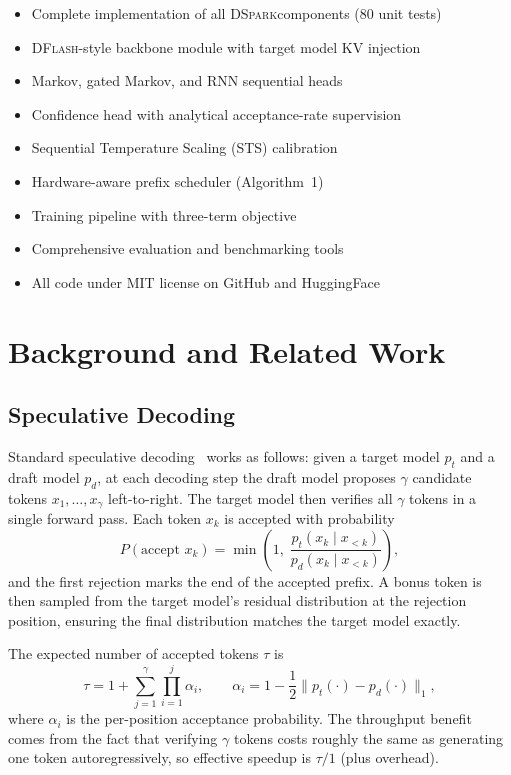 \documentclass[11pt,a4paper]{article}
\newcommand{\DSpark}{\textsc{DSpark}}
\newcommand{\DFlash}{\textsc{DFlash}}
\begin{document}
\begin{itemize}
  \item Complete implementation of all \DSpark components (80 unit tests)
  \item \DFlash-style backbone module with target model KV injection
  \item Markov, gated Markov, and RNN sequential heads
  \item Confidence head with analytical acceptance-rate supervision
  \item Sequential Temperature Scaling (STS) calibration
  \item Hardware-aware prefix scheduler (Algorithm~1)
  \item Training pipeline with three-term objective
  \item Comprehensive evaluation and benchmarking tools
  \item All code under MIT license on GitHub and HuggingFace
\end{itemize}

\section{Background and Related Work}
\label{sec:background}

\subsection{Speculative Decoding}
Standard speculative decoding~\cite{leviathan2023fast,
chen2023accelerating} works as follows: given a target model $p_t$ and a
draft model $p_d$, at each decoding step the draft model proposes $\gamma$
candidate tokens $x_1, \ldots, x_\gamma$ left-to-right. The target model
then verifies all $\gamma$ tokens in a single forward pass. Each token $x_k$
is accepted with probability
\begin{equation}
  \textstyle
  P(\text{accept } x_k) = \min\left(1,\; \frac{p_t(x_k \mid x_{<k})}{p_d(x_k \mid x_{<k})}\right),
  \label{eq:acceptance}
\end{equation}
and the first rejection marks the end of the accepted prefix. A bonus token
is then sampled from the target model's residual distribution at the rejection
position, ensuring the final distribution matches the target model exactly.

The expected number of accepted tokens $\tau$ is
\begin{equation}
  \tau = 1 + \sum_{j=1}^\gamma \prod_{i=1}^j \alpha_i,
  \qquad
  \alpha_i = 1 - \frac12 \|p_t(\cdot) - p_d(\cdot)\|_1,
  \label{eq:expected_tau}
\end{equation}
where $\alpha_i$ is the per-position acceptance probability. The throughput
benefit comes from the fact that verifying $\gamma$ tokens costs roughly the
same as generating one token autoregressively, so effective speedup is
$\tau / 1$ (plus overhead).
\end{document}
